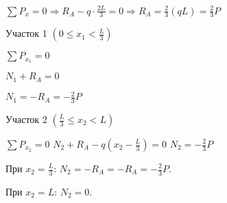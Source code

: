 $ \sum P_x = 0 \Rightarrow R_A - q \cdot \frac{2L}{3} = 0 \Rightarrow R_A = \frac{2}{3} \left(qL\right) = \frac{2}{3} P $

\vspace{1.5ex}

Участок 1 $ \left(0 \le x_1 < \frac{L}{3}\right) $

$ \sum P_{x_1} = 0 $

$ N_1 + R_A = 0 $

$ N_1 = -R_A = -\frac{2}{3} P $

\vspace{1.5ex}

Участок 2 $ \left(\frac{L}{3} \le x_2 < L\right) $

$ \sum P_{x_2} = 0 $
$ N_2 + R_A - q \left(x_2 - \frac{L}{3}\right) = 0 $
$ N_2 = -\frac{2}{3} P $

При $ x_2 = \frac{L}{3} $: $ N_2 = -R_A = -R_A = -\frac{2}{3} P $.

При $ x_2 = L $:           $ N_2 = 0 $.
